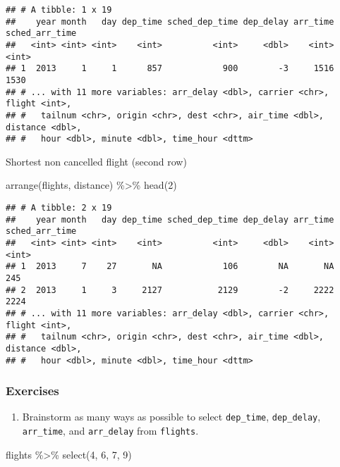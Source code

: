 \documentclass[
]{article}
\newenvironment{Shaded}{\begin{snugshade}}{\end{snugshade}}
\newcommand{\DecValTok}[1]{\textcolor[rgb]{0.00,0.00,0.81}{#1}}
\newcommand{\FunctionTok}[1]{\textcolor[rgb]{0.00,0.00,0.00}{#1}}
\newcommand{\NormalTok}[1]{#1}
\newcommand{\SpecialCharTok}[1]{\textcolor[rgb]{0.00,0.00,0.00}{#1}}
\providecommand{\tightlist}{%
  \setlength{\itemsep}{0pt}\setlength{\parskip}{0pt}}
\begin{document}
\begin{verbatim}
## # A tibble: 1 x 19
##    year month   day dep_time sched_dep_time dep_delay arr_time sched_arr_time
##   <int> <int> <int>    <int>          <int>     <dbl>    <int>          <int>
## 1  2013     1     1      857            900        -3     1516           1530
## # ... with 11 more variables: arr_delay <dbl>, carrier <chr>, flight <int>,
## #   tailnum <chr>, origin <chr>, dest <chr>, air_time <dbl>, distance <dbl>,
## #   hour <dbl>, minute <dbl>, time_hour <dttm>
\end{verbatim}

Shortest non cancelled flight (second row)

\begin{Shaded}
\begin{Highlighting}[]
\FunctionTok{arrange}\NormalTok{(flights, distance) }\SpecialCharTok{\%\textgreater{}\%} \FunctionTok{head}\NormalTok{(}\DecValTok{2}\NormalTok{)}
\end{Highlighting}
\end{Shaded}

\begin{verbatim}
## # A tibble: 2 x 19
##    year month   day dep_time sched_dep_time dep_delay arr_time sched_arr_time
##   <int> <int> <int>    <int>          <int>     <dbl>    <int>          <int>
## 1  2013     7    27       NA            106        NA       NA            245
## 2  2013     1     3     2127           2129        -2     2222           2224
## # ... with 11 more variables: arr_delay <dbl>, carrier <chr>, flight <int>,
## #   tailnum <chr>, origin <chr>, dest <chr>, air_time <dbl>, distance <dbl>,
## #   hour <dbl>, minute <dbl>, time_hour <dttm>
\end{verbatim}

\hypertarget{exercises-2}{%
\subsubsection{Exercises}\label{exercises-2}}

\begin{enumerate}
\def\labelenumi{\arabic{enumi}.}
\tightlist
\item
  Brainstorm as many ways as possible to select \texttt{dep\_time},
  \texttt{dep\_delay}, \texttt{arr\_time}, and \texttt{arr\_delay} from
  \texttt{flights}.
\end{enumerate}

\begin{Shaded}
\begin{Highlighting}[]
\NormalTok{flights }\SpecialCharTok{\%\textgreater{}\%} \FunctionTok{select}\NormalTok{(}\DecValTok{4}\NormalTok{, }\DecValTok{6}\NormalTok{, }\DecValTok{7}\NormalTok{, }\DecValTok{9}\NormalTok{)}
\end{Highlighting}
\end{Shaded}
\end{document}
